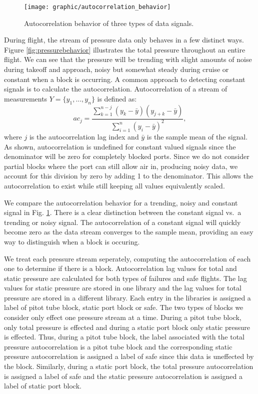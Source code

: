 \documentclass[]{aiaa-tc}
\begin{document}
\begin{figure}
\centering
\texttt{[image: graphic/autocorrelation\_behavior]}
\caption{\label{fig:autocorrelationbehavior} Autocorrelation behavior of three types of data signals.}
\end{figure}

During flight, the stream of pressure data only behaves in a few distinct ways. Figure \ref{fig:pressurebehavior} illustrates the total pressure throughout an entire flight. We can see that the pressure will be trending with slight amounts of noise during takeoff and approach, noisy but somewhat steady during cruise or constant when a block is occurring. A common approach to detecting constant signals is to calculate the autocorrelation. Autocorrelation of a stream of measurements $Y = \{y_1,...,y_n\}$ is defined as: 
\begin{equation}
ac_j = \frac{\displaystyle\sum_{k=1}^{n-j}({y_k-\bar{y}})({y_{j+k}-\bar{y}})}{\displaystyle \sum_{i=1}^n (y_i - \bar{y})^2},
\label{eq:autocor}
\end{equation}
where $j$ is the autocorrelation lag index and $\bar{y}$ is the sample mean of the signal\cite{autocorrelation}. As shown, autocorrelation is undefined for constant valued signals since the denominator will be zero for completely blocked ports. Since we do not consider partial blocks where the port can still allow air in, producing noisy data, we account for this division by zero by adding 1 to the denominator. This allows the autocorrelation to exist while still keeping all values equivalently scaled.

We compare the autocorrelation behavior for a trending, noisy and constant signal in Fig. \ref{fig:autocorrelationbehavior}. There is a clear distinction between the constant signal vs.\ a trending or noisy signal. The autocorrelation of a constant signal will quickly become zero as the data stream converges to the sample mean, providing an easy way to distinguish when a block is occuring. 

We treat each pressure stream seperately, computing the autocorrelation of each one to determine if there is a block. Autocorrelation lag values for total and static pressure are calculated for both types of failures and safe flights. The lag values for static pressure are stored in one library and the lag values for total pressure are stored in a different library. Each entry in the libraries is assigned a label of pitot tube block, static port block or safe. The two types of blocks we consider only effect one pressure stream at a time. During a pitot tube block, only total pressure is effected and during a static port block only static pressure is effected. Thus, during a pitot tube block, the label associated with the total pressure autocorrelation is a pitot tube block and the corresponding static pressure autocorrelation is assigned a label of safe since this data is uneffected by the block. Similarly, during a static port block, the total pressure autocorrelation is assigned a label of safe and the static pressure autocorrelation is assigned a label of static port block. 
\end{document}
